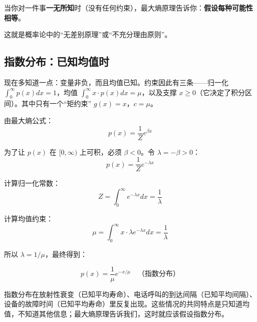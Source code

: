\begin{insightbox}
当你对一件事\textbf{一无所知}时（没有任何约束），最大熵原理告诉你：\textbf{假设每种可能性相等}。

这就是概率论中的“无差别原理”或“不充分理由原则”。
\end{insightbox}

\subsection{指数分布：已知均值时}

现在多知道一点：变量非负，而且均值已知。约束因此有三条——归一化 $\int_0^\infty p(x) dx = 1$，均值 $\int_0^\infty x \cdot p(x) dx = \mu$，以及支撑 $x \geq 0$（它决定了积分区间）。其中只有一个“矩约束” $g(x) = x$，$c = \mu$。

由最大熵公式：
\begin{equation}
p(x) = \frac{1}{Z} e^{\beta x}
\end{equation}

为了让 $p(x)$ 在 $[0, \infty)$ 上可积，必须 $\beta < 0$。令 $\lambda = -\beta > 0$：
\begin{equation}
p(x) = \frac{1}{Z} e^{-\lambda x}
\end{equation}

计算归一化常数：
\begin{equation}
Z = \int_0^\infty e^{-\lambda x} dx = \frac{1}{\lambda}
\end{equation}

计算均值约束：
\begin{equation}
\mu = \int_0^\infty x \cdot \lambda e^{-\lambda x} dx = \frac{1}{\lambda}
\end{equation}

所以 $\lambda = 1/\mu$，最终得到：

\begin{equation}
\boxed{p(x) = \frac{1}{\mu} e^{-x/\mu}} \quad \text{（指数分布）}
\end{equation}

\begin{physicalmeaning}
指数分布在放射性衰变（已知平均寿命）、电话呼叫的到达间隔（已知平均间隔）、设备的故障时间（已知平均寿命）里反复出现。这些情况的共同特点是只知道均值，不知道其他信息；最大熵原理告诉我们，这时就应该假设指数分布。
\end{physicalmeaning}

